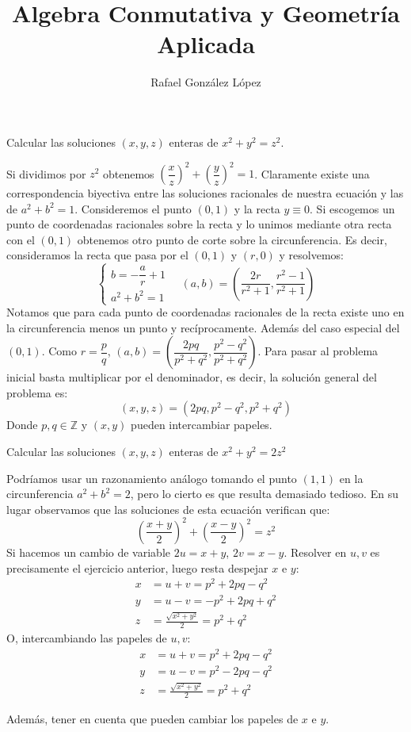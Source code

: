 \documentclass[twoside]{article}
\newenvironment{ejercicio}[2][Estado]{\begin{trivlist}
\item[\hskip \labelsep {\bfseries Ejercicio}\hskip \labelsep {\bfseries #2.}]}{\end{trivlist}}
\newenvironment{solucion}{\begin{trivlist}
\item[\hskip \labelsep {\textit{Solución}.}\hskip \labelsep]}{\end{trivlist}}
\numberwithin{equation}{section}
\begin{document}
\title{Algebra Conmutativa y Geometría Aplicada}
\author{Rafael González López}
\maketitle

\begin{ejercicio}{1}
Calcular las soluciones $(x,y,z)$ enteras de $x^2+y^2=z^2$.
\begin{solucion}
Si dividimos por $z^2$ obtenemos $\left(\dfrac{x}{z}\right)^2+\left(\dfrac{y}{z}\right)^2=1$. Claramente existe una correspondencia biyectiva entre las soluciones racionales de nuestra ecuación y las de $a^2+b^2=1$. Consideremos el punto $(0,1)$ y la recta $y\equiv 0$. Si escogemos un punto de coordenadas racionales sobre la recta y lo unimos mediante otra recta con el $(0,1)$ obtenemos otro punto de corte sobre la circunferencia. Es decir, consideramos la recta que pasa por el $(0,1)$ y $(r,0)$ y resolvemos:
\[\begin{cases}
b=-\dfrac{a}{r}+1\\
a^2+b^2=1
\end{cases} \quad (a,b) = \left(\dfrac{2r}{r^2+1},\frac{r^2-1}{r^2+1}\right)
\]
Notamos que para cada punto de coordenadas racionales de la recta existe uno en la circunferencia menos un punto y recíprocamente. Además del caso especial del $(0,1)$. Como $r=\dfrac{p}{q}$, $(a,b)=\left(\dfrac{2pq}{p^2+q^2},\dfrac{p^2-q^2}{p^2+q^2}\right)$. Para pasar al problema inicial basta multiplicar por el denominador, es decir, la solución general del problema es:
\[(x,y,z)= \left(2pq,{p^2-q^2},{p^2+q^2}\right)\]
Donde $p,q\in\mathbb{Z}$ y $(x,y)$ pueden intercambiar papeles.
\end{solucion}
\end{ejercicio}
\newpage
\begin{ejercicio}{2}
Calcular las soluciones $(x,y,z)$ enteras de $x^2+y^2=2z^2$
\begin{solucion}
Podríamos usar un razonamiento análogo tomando el punto $(1,1)$ en la circunferencia $a^2+b^2=2$, pero lo cierto es que resulta demasiado tedioso. En su lugar observamos que las soluciones de esta ecuación verifican que:
\[
\left(\frac{x+y}{2}\right)^2+\left(\frac{x-y}{2}\right)^2=z^2
\]
Si hacemos un cambio de variable $2u=x+y$, $2v = x-y$. Resolver en $u,v$ es precisamente el ejercicio anterior, luego resta despejar $x$ e $y$:
\begin{align*}
x &= u + v = p^2+2pq -q^2\\
y &= u - v = - p^2+ 2pq +q^2\\
z &= \frac{\sqrt{x^2+y^2}}{2} =  p^2+q^2
\end{align*}
O, intercambiando las papeles de $u,v$: 
\begin{align*}
x &= u + v = p^2+2pq -q^2\\
y &= u - v =  p^2-2pq -q^2\\
z &= \frac{\sqrt{x^2+y^2}}{2} =  p^2+q^2
\end{align*}
\end{solucion}
Además, tener en cuenta que pueden cambiar los papeles de $x$ e $y$.
\end{ejercicio}
\end{document}
